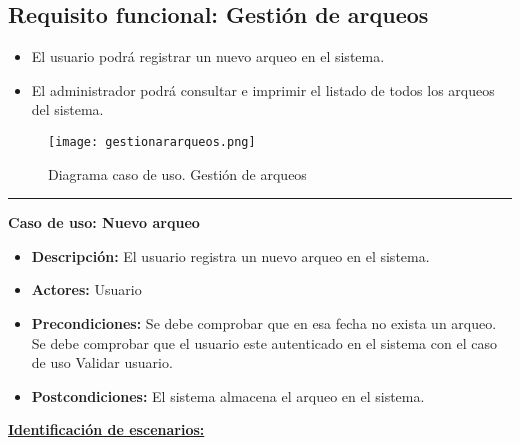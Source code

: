 \subsection{Requisito funcional: Gestión de arqueos}

\begin{itemize}
 \item El usuario podrá registrar un nuevo arqueo en el sistema.
 \item El administrador podrá consultar e imprimir el listado de todos los arqueos del sistema.
\end{itemize}
\begin{figure}[H]
  \centering
    \texttt{[image: gestionararqueos.png]}
  \caption{Diagrama caso de uso. Gestión de arqueos}
  \label{cu1}
\end{figure}
\smallskip
\hrule height 1pt
\smallskip
\textbf{Caso de uso: Nuevo arqueo}
\begin{itemize}\renewcommand{\labelitemi}{$\cdot$}
 \item \textbf{Descripción:} El usuario registra un nuevo arqueo en el sistema.
  \item \textbf{Actores:} Usuario
  \item \textbf{Precondiciones:} Se debe comprobar que en esa fecha no exista un arqueo. Se debe comprobar que el usuario este autenticado en el sistema con el caso de uso Validar usuario.
  \item \textbf{Postcondiciones:} El sistema almacena el arqueo en el sistema.
\end{itemize}
\underline{\textbf{Identificación de escenarios:}}

